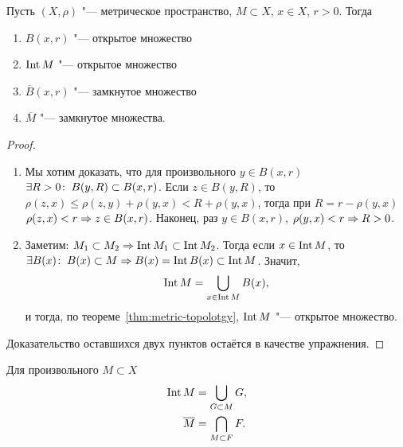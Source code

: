 \documentclass[main]{subfiles}
\begin{document}
\begin{theorem}
  Пусть \( (X, \rho) \) "--- метрическое пространство,
  \( M \subset X \), \( x \in X \), \( r > 0 \).
  Тогда
  \begin{enumerate}
    \item \( B(x, r) \) "--- открытое множество
    \item \( \operatorname{Int} M \) "--- открытое множество
    \item \( \overline{B}(x, r) \) "--- замкнутое множество
    \item  \( \overline{M} \) "--- замкнутое множества.
  \end{enumerate}
\end{theorem}
\begin{proof}~
  \begin{enumerate}
    \item Мы хотим доказать, что для произвольного \( y \in B(x, r) \)
      \( \exists R > 0 \colon \: B(y, R) \subset B(x, r) \).
      Если \( z \in B(y, R) \), то
      \( \rho(z, x) \le \rho(z, y) + \rho(y, x) < R + \rho(y, x) \),
      тогда при \( R = r - \rho(y, x) \) \( \rho(z, x) < r \Rightarrow z \in B(x, r) \).
      Наконец, раз \( y \in B(x, r) \), \( \rho(y, x) < r \Rightarrow R > 0 \).

    \item Заметим: \( M_1 \subset M_2 \Rightarrow \operatorname{Int} M_1 \subset \operatorname{Int} M_2 \).
      Тогда если \( x \in \operatorname{Int} M \), то
      \( \exists B(x) \colon \: B(x) \subset M \Rightarrow
      B(x) = \operatorname{Int} B(x) \subset \operatorname{Int} M \).
      Значит,
      \[ \operatorname{Int} M = \bigcup_{x \in \operatorname{Int} M} B(x), \]
      и тогда, по теореме~\ref{thm:metric-topolotgy},
      \( \operatorname{Int} M \) "--- открытое множество.
  \end{enumerate}
  Доказательство оставшихся двух пунктов остаётся в качестве упражнения.
\end{proof}

\begin{remark}
  Для произвольного \( M \subset X \)
  \begin{align}
    \operatorname{Int} M       &= \bigcup_{G \subset M} G, \\
    \overline{M} &= \bigcap_{M \subset F} F.
  \end{align}
\end{remark}
\end{document}
